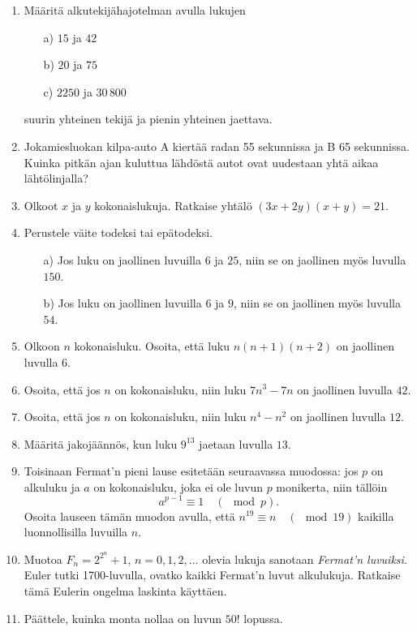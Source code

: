 \begin{enumerate}
\item Määritä alkutekijähajotelman avulla lukujen
\begin{itemize}
\item[a)] $15$ ja $42$
\item[b)] $20$ ja $75$
\item[c)] $2250$ ja $30\,800$
\end{itemize}
suurin yhteinen tekijä ja pienin yhteinen jaettava.

\item
Jokamiesluokan kilpa-auto A kiertää radan 55 sekunnissa ja B
65 sekunnissa. Kuinka pitkän ajan kuluttua lähdöstä autot ovat
uudestaan yhtä aikaa lähtölinjalla?

\item Olkoot $x$ ja $y$ kokonaislukuja. Ratkaise yhtälö $(3x+2y)
(x+y)=21$.

\item Perustele väite todeksi tai epätodeksi.
\begin{itemize}
\item[a)] Jos luku on jaollinen luvuilla $6$ ja $25$, niin se on
jaollinen myös luvulla $150$.
\item[b)] Jos luku on jaollinen luvuilla $6$ ja $9$, niin se on
jaollinen myös luvulla $54$.
\end{itemize}

\item Olkoon $n$ kokonaisluku. Osoita, että luku $n(n+1)(n+2)$ on
jaollinen luvulla $6$.

\item Osoita, että jos $n$ on kokonaisluku, niin luku $7n^3 - 7n$
on jaollinen luvulla $42$.

\item Osoita, että jos $n$ on kokonaisluku, niin luku $n^4 - n^2$
on jaollinen luvulla $12$.

\item
Määritä jakojäännös, kun luku $9^{13}$ jaetaan luvulla $13$.

\item Toisinaan Fermat'n pieni lause esitetään seuraavassa
muodossa:
jos $p$ on alkuluku ja $a$ on kokonaisluku, joka ei ole
luvun $p$ monikerta, niin tällöin
\[
a^{p-1}\equiv 1\quad (\mod p).
\]
Osoita lauseen tämän muodon avulla, että $n^{19}\equiv n \quad
(\mod 19)$ kaikilla luonnollisilla luvuilla $n$.

\item
Muotoa $F_n = 2^{2^n}+1$, $n=0,1,2,\ldots$ olevia lukuja sanotaan
{\em Fermat'n luvuiksi}. Euler tutki 1700-luvulla, ovatko kaikki
Fermat'n luvut alkulukuja. Ratkaise tämä Eulerin ongelma laskinta
käyttäen.

\item Päättele, kuinka monta nollaa on luvun $50!$ lopussa.

\end{enumerate}

